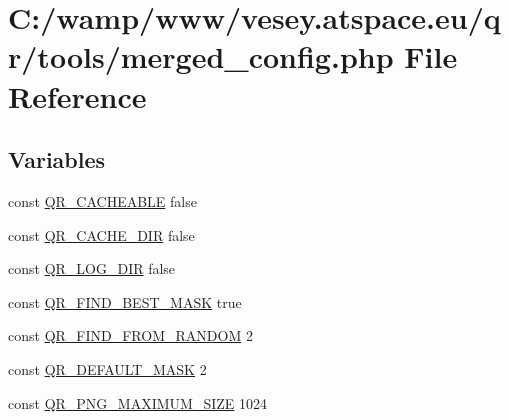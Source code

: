 \hypertarget{merged__config_8php}{\section{C\-:/wamp/www/vesey.atspace.\-eu/qr/tools/merged\-\_\-config.php File Reference}
\label{merged__config_8php}
}
\subsection*{Variables}
\begin{DoxyCompactItemize}
\item 
const \hyperlink{merged__config_8php_a2e289dc15e8d9d0c93bcb589e2e4fa7f}{Q\-R\-\_\-\-C\-A\-C\-H\-E\-A\-B\-L\-E} false
\item 
const \hyperlink{merged__config_8php_a30bc15179f940c7cefe147c7c10d21d2}{Q\-R\-\_\-\-C\-A\-C\-H\-E\-\_\-\-D\-I\-R} false
\item 
const \hyperlink{merged__config_8php_a31f4c0eeeec4e117adbfb95bdc0b34cc}{Q\-R\-\_\-\-L\-O\-G\-\_\-\-D\-I\-R} false
\item 
const \hyperlink{merged__config_8php_af4ec4aec5be16e8785674055683659e6}{Q\-R\-\_\-\-F\-I\-N\-D\-\_\-\-B\-E\-S\-T\-\_\-\-M\-A\-S\-K} true
\item 
const \hyperlink{merged__config_8php_a4a3b50c407bbdf7ffa1197a666947bec}{Q\-R\-\_\-\-F\-I\-N\-D\-\_\-\-F\-R\-O\-M\-\_\-\-R\-A\-N\-D\-O\-M} 2
\item 
const \hyperlink{merged__config_8php_ad558bfb85d8139a05d1d663579be938b}{Q\-R\-\_\-\-D\-E\-F\-A\-U\-L\-T\-\_\-\-M\-A\-S\-K} 2
\item 
const \hyperlink{merged__config_8php_a45b4274e494e9533fab417bc0aa0eb2a}{Q\-R\-\_\-\-P\-N\-G\-\_\-\-M\-A\-X\-I\-M\-U\-M\-\_\-\-S\-I\-Z\-E} 1024
\end{DoxyCompactItemize}


